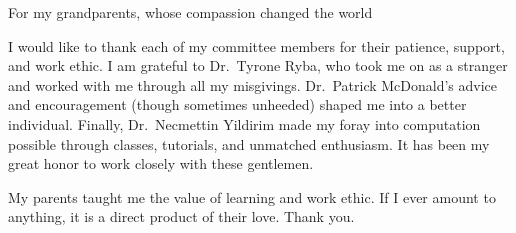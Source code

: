 
\begin{dedication}
For my grandparents, whose compassion changed the world
\end{dedication}

\begin{acknowledgements}
I would like to thank each of my committee members for their patience, support, and work ethic.  I am grateful to Dr.\ Tyrone Ryba, who
took me on as a stranger and worked with me through all my misgivings.  Dr.\ Patrick McDonald's advice and encouragement (though sometimes
unheeded) shaped me into a better individual.  Finally, Dr.\ Necmettin Yildirim made my foray into computation possible through classes,
tutorials, and unmatched enthusiasm.  It has been my great honor to work closely with these gentlemen.

My parents taught me the value of learning and work ethic.  If I ever amount to anything, it is a direct product of their love.  Thank you.
\end{acknowledgements}
